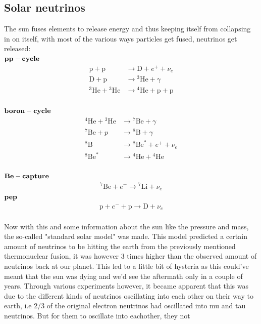 \documentclass[11pt,a4paper,faculty=we,language=en,doctype=report]{cls/ugent-doc}
\begin{document}
\subsection{Solar neutrinos}
The sun fuses elements to release energy and thus keeping itself from collapsing in 
on itself, with most of the various ways particles get fused, neutrinos get released:\\
$\bold{pp-cycle}$
\begin{align}
	\mathrm{p} + \mathrm{p} &\rightarrow \mathrm{D} + e^+ + \nu_e\\
	\mathrm{D} + \mathrm{p} &\rightarrow {}^3\mathrm{He} + \gamma\\
	{}^3\mathrm{He} + {}^3\mathrm{He} &\rightarrow {}^4\mathrm{He} + \mathrm{p} + \mathrm{p}
\end{align}\\
$\bold{boron-cycle}$
\begin{align}
{ }^4 \mathrm{He}+{ }^3 \mathrm{He} & \rightarrow{ }^7 \mathrm{Be}+\gamma \\
{ }^7 \mathrm{Be}+p & \rightarrow { }^8\mathrm{B} + \gamma \\
{ }^8 \mathrm{B} & \rightarrow{ }^8 \mathrm{Be}^*+e^{+}+\nu_e \\
{ }^8 \mathrm{Be}^* & \rightarrow{ }^4 \mathrm{He}+{ }^4 \mathrm{He}
\end{align}\\
$\bold{Be-capture}$
\begin{align}
	^7\mathrm{Be} + e^- \rightarrow {}^7\mathrm{Li} + \nu_e
\end{align}
$\bold{pep}$
\begin{align}
	\mathrm{p} + e^- + \mathrm{p} \rightarrow \mathrm{D} + \nu_e
\end{align}\\
Now with this and some information about the sun like the pressure and mass,
the so-called "standard solar model" was made. This model predicted a certain
amount of neutrinos to be hitting the earth from the previously mentioned
thermonuclear fusion, it was however 3 times higher than the observed amount of
neutrinos back at our planet. This led to a little bit of hysteria as this could've meant
that the sun was dying and we'd see the aftermath only in a couple of years.
Through various experiments however, it became apparent that this was due to
the different kinds of neutrinos oscillating into each other on their way to
earth, i.e 2/3 of the original electron neutrinos had oscillated into mu and
tau neutrinos. But for them to oscillate into eachother, they not
\end{document}
